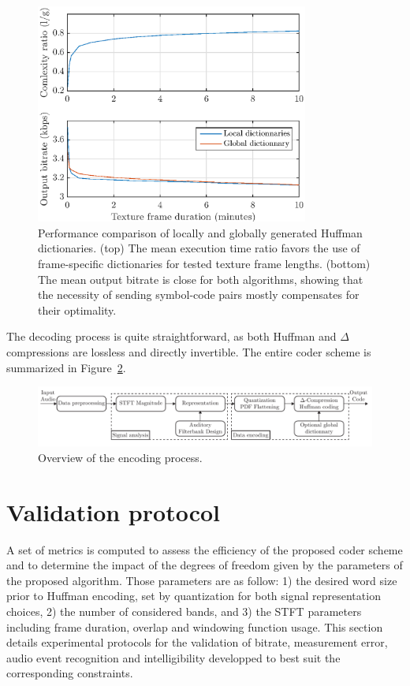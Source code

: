 \documentclass[sensors,article,submit,moreauthors,pdftex,10pt,a4paper]{mdpi}
\begin{document}
\begin{figure}[htbp]
	\centering
		\includegraphics[width=0.8\textwidth]{figures/dict_comp.eps}
	\caption{Performance comparison of locally and globally generated Huffman dictionaries. (top) The mean execution time ratio favors the use of frame-specific dictionaries for tested texture frame lengths. (bottom) The mean output bitrate is close for both algorithms, showing that the necessity of sending symbol-code pairs mostly compensates for their optimality.}
	\label{fig:dict_comp}
\end{figure}

The decoding process is quite straightforward, as both Huffman and $\Delta$ compressions are lossless and directly invertible. The entire coder scheme is summarized in Figure~\ref{fig:scheme}.

\begin{figure}[htbp]
	\centering
		\includegraphics[width=.9\textwidth]{figures/scheme.pdf}
	\caption{Overview of the encoding process.}
	\label{fig:scheme}
\end{figure}

\section{Validation protocol} \label{sec:protocol}

A set of metrics is computed to assess the efficiency of the proposed coder scheme and to determine the impact of the degrees of freedom given by the parameters of the proposed algorithm. Those parameters are as follow: 1) the desired word size prior to Huffman encoding, set by quantization for both signal representation choices, 2) the number of considered bands, and 3) the STFT parameters including frame duration, overlap and windowing function usage. This section details experimental protocols for the validation of bitrate, measurement error, audio event recognition and intelligibility developped to best suit the corresponding constraints.
\end{document}
